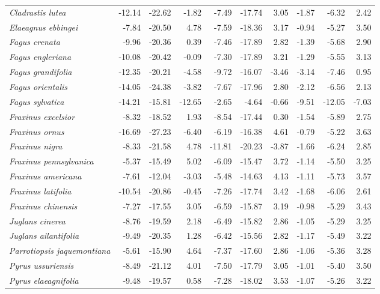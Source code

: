 \documentclass[11pt]{article}
\begin{document}
\begin{longtable}{lrrrrrrrrr}
  \emph{Cladrastis lutea} & -12.14 & -22.62 & -1.82 & -7.49 & -17.74 & 3.05 & -1.87 & -6.32 & 2.42 \\ 
  \emph{Elaeagnus ebbingei} & -7.84 & -20.50 & 4.78 & -7.59 & -18.36 & 3.17 & -0.94 & -5.27 & 3.50 \\ 
  \emph{Fagus crenata} & -9.96 & -20.36 & 0.39 & -7.46 & -17.89 & 2.82 & -1.39 & -5.68 & 2.90 \\ 
  \emph{Fagus engleriana} & -10.08 & -20.42 & -0.09 & -7.30 & -17.89 & 3.21 & -1.29 & -5.55 & 3.13 \\ 
  \emph{Fagus grandifolia} & -12.35 & -20.21 & -4.58 & -9.72 & -16.07 & -3.46 & -3.14 & -7.46 & 0.95 \\ 
  \emph{Fagus orientalis} & -14.05 & -24.38 & -3.82 & -7.67 & -17.96 & 2.80 & -2.12 & -6.56 & 2.13 \\ 
  \emph{Fagus sylvatica} & -14.21 & -15.81 & -12.65 & -2.65 & -4.64 & -0.66 & -9.51 & -12.05 & -7.03 \\ 
  \emph{Fraxinus excelsior} & -8.32 & -18.52 & 1.93 & -8.54 & -17.44 & 0.30 & -1.54 & -5.89 & 2.75 \\ 
  \emph{Fraxinus ornus} & -16.69 & -27.23 & -6.40 & -6.19 & -16.38 & 4.61 & -0.79 & -5.22 & 3.63 \\ 
  \emph{Fraxinus nigra} & -8.33 & -21.58 & 4.78 & -11.81 & -20.23 & -3.87 & -1.66 & -6.24 & 2.85 \\ 
  \emph{Fraxinus pennsylvanica} & -5.37 & -15.49 & 5.02 & -6.09 & -15.47 & 3.72 & -1.14 & -5.50 & 3.25 \\ 
  \emph{Fraxinus americana} & -7.61 & -12.04 & -3.03 & -5.48 & -14.63 & 4.13 & -1.11 & -5.73 & 3.57 \\ 
  \emph{Fraxinus latifolia} & -10.54 & -20.86 & -0.45 & -7.26 & -17.74 & 3.42 & -1.68 & -6.06 & 2.61 \\ 
  \emph{Fraxinus chinensis} & -7.27 & -17.55 & 3.05 & -6.59 & -15.87 & 3.19 & -0.98 & -5.29 & 3.43 \\ 
  \emph{Juglans cinerea} & -8.76 & -19.59 & 2.18 & -6.49 & -15.82 & 2.86 & -1.05 & -5.29 & 3.25 \\ 
  \emph{Juglans ailantifolia} & -9.49 & -20.35 & 1.28 & -6.42 & -15.56 & 2.82 & -1.17 & -5.49 & 3.22 \\ 
  \emph{Parrotiopsis jaquemontiana} & -5.61 & -15.90 & 4.64 & -7.37 & -17.60 & 2.86 & -1.06 & -5.36 & 3.28 \\ 
  \emph{Pyrus ussuriensis} & -8.49 & -21.12 & 4.01 & -7.50 & -17.79 & 3.05 & -1.01 & -5.40 & 3.50 \\ 
  \emph{Pyrus elaeagnifolia} & -9.48 & -19.57 & 0.58 & -7.28 & -18.02 & 3.53 & -1.07 & -5.26 & 3.22 \\ 

\end{longtable}
\end{document}
